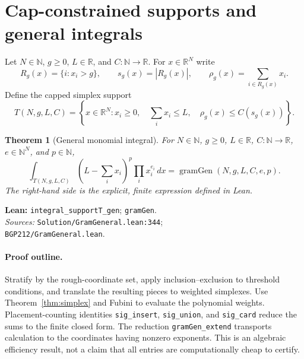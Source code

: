 \documentclass[11pt]{article}
\newtheorem{theorem}{Theorem}[section]
\newcommand{\R}{\mathbb{R}}
\newcommand{\N}{\mathbb{N}}
\newcommand{\gram}{\operatorname{gramGen}}
\newcommand{\code}[1]{\texttt{#1}}
\begin{document}
\section{Cap-constrained supports and general integrals}
Let $N\in\N$, $g\ge0$, $L\in\R$, and $C:\N\to\R$. For $x\in\R^N$ write
\[
 R_g(x)=\{i:x_i>g\},\qquad s_g(x)=|R_g(x)|,\qquad
 \rho_g(x)=\sum_{i\in R_g(x)}x_i.
\]
Define the capped simplex support
\begin{equation}\label{eq:support}
 T(N,g,L,C)=\left\{x\in\R^N:x_i\ge0,\quad
 \sum_i x_i\le L,\quad \rho_g(x)\le C(s_g(x))\right\}.
\end{equation}
\begin{theorem}[General monomial integral]\label{thm:general}
For $N\in\N$, $g\ge0$, $L\in\R$, $C:\N\to\R$, $e\in\N^N$, and $p\in\N$,
\begin{equation}\label{eq:gram}
 \int_{T(N,g,L,C)}\left(L-\sum_i x_i\right)^p
 \prod_i x_i^{e_i}\,dx
 =\gram(N,g,L,C,e,p).
\end{equation}
The right-hand side is the explicit, finite expression defined in Lean.
\end{theorem}
\noindent\textbf{Lean:} \code{integral\_supportT\_gen}; \code{gramGen}.\\
\textit{Sources:} \nolinkurl{Solution/GramGeneral.lean:344};\\
\nolinkurl{BGP212/GramGeneral.lean}.

\paragraph{Proof outline.}
Stratify by the rough-coordinate set, apply inclusion--exclusion to threshold
conditions, and translate the resulting pieces to weighted simplexes. Use
Theorem~\ref{thm:simplex} and Fubini to evaluate the polynomial weights.
Placement-counting identities \code{sig\_insert}, \code{sig\_union}, and
\code{sig\_card} reduce the sums to the finite closed form. The reduction
\code{gramGen\_extend} transports calculation to the coordinates having nonzero
exponents. This is an algebraic efficiency result, not a claim that all entries are
computationally cheap to certify.
\end{document}
